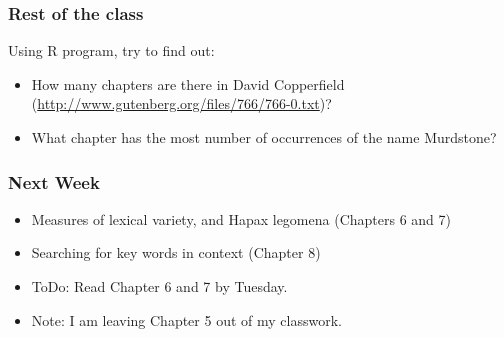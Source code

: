 \documentclass{beamer}
\begin{document}
\begin{frame}
\frametitle{Rest of the class}
Using R program, try to find out:
\begin{itemize}
\item How many chapters are there in David Copperfield (\url{http://www.gutenberg.org/files/766/766-0.txt})?
\item What chapter has the most number of occurrences of the name Murdstone?
\end{itemize}
\end{frame}

\begin{frame}
\frametitle{Next Week}
\begin{itemize}
\item Measures of lexical variety, and Hapax legomena (Chapters 6 and 7)
\item Searching for key words in context (Chapter 8)
\item ToDo: Read Chapter 6 and 7 by Tuesday. 
\item Note: I am leaving Chapter 5 out of my classwork.
\end{itemize}
\end{frame}
\end{document}
